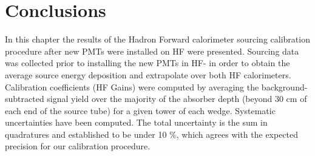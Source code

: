\section{Conclusions}
In this chapter the results of the Hadron Forward calorimeter sourcing calibration procedure after new PMTs were installed on HF were presented. Sourcing data was collected prior to installing the new PMTs in HF- in order to obtain the average source energy deposition and extrapolate over both HF calorimeters. Calibration coefficients (HF Gains) were computed by averaging the background-subtracted signal yield over the majority of the absorber depth (beyond 30 cm of each end of the source tube) for a given tower of each wedge. Systematic uncertainties have been computed. The total uncertainty is the sum in quadratures and established to be under 10 \%, which agrees with the expected precision for our calibration procedure.